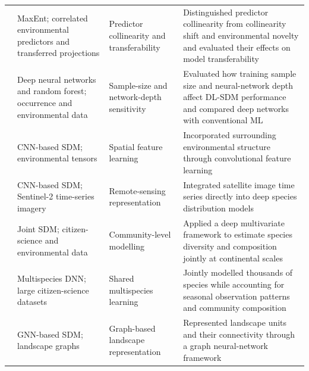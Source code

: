 \documentclass[authoryear,preprint,review,12pt]{elsarticle}
\begin{document}
\begin{xltabular}{\textwidth}{
@{}
Y{0.70}
Y{1.10}
Y{0.80}
Y{1.40}
@{}
}
\citep{feng2019collinearity} &
MaxEnt; correlated environmental predictors and transferred projections &
Predictor collinearity and transferability &
Distinguished predictor collinearity from collinearity shift and environmental novelty and evaluated their effects on model transferability \\

\citep{benkendorf2020sample} &
Deep neural networks and random forest; occurrence and environmental data &
Sample-size and network-depth sensitivity &
Evaluated how training sample size and neural-network depth affect DL-SDM performance and compared deep networks with conventional ML \\

\citep{deneu2021convolutional} &
CNN-based SDM; environmental tensors &
Spatial feature learning &
Incorporated surrounding environmental structure through convolutional feature learning \\

\citep{estopinan2022deep} &
CNN-based SDM; Sentinel-2 time-series imagery &
Remote-sensing representation &
Integrated satellite image time series directly into deep species distribution models \\

\citep{davis2023deep} &
Joint SDM; citizen-science and environmental data &
Community-level modelling &
Applied a deep multivariate framework to estimate species diversity and composition jointly at continental scales \\

\citep{brun2024multispecies} &
Multispecies DNN; large citizen-science datasets &
Shared multispecies learning &
Jointly modelled thousands of species while accounting for seasonal observation patterns and community composition \\

\citep{wu2025gnn} &
GNN-based SDM; landscape graphs &
Graph-based landscape representation &
Represented landscape units and their connectivity through a graph neural-network framework \\

\end{xltabular}
\endgroup

\end{document}
